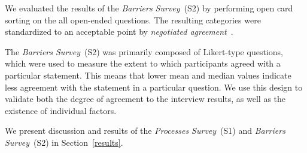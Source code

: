We evaluated the results of the \textit{Barriers Survey}~(S2) by performing open card sorting on the all open-ended questions.
The resulting categories were standardized to an acceptable point by \textit{negotiated agreement}~\cite{ritchie2013qualitative}.

The \textit{Barriers Survey}~(S2) was primarily composed of Likert-type questions, which were used to measure the extent to which participants agreed with a particular statement.
This means that lower mean and median values indicate less agreement with the statement in a particular question.
We use this design to validate both the degree of agreement to the interview results, as well as the existence of individual factors.

We present discussion and results of the \textit{Processes Survey}~(S1) and \textit{Barriers Survey}~(S2) in Section~\ref{results}. 